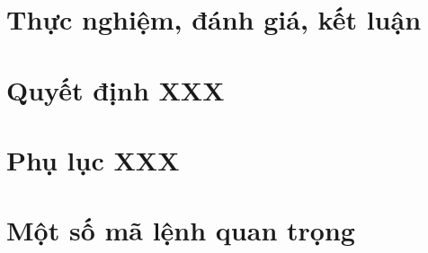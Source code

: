 \documentclass[a4paper,oneside,openright]{memoir}
\begin{document}
\chapter{Thực nghiệm, đánh giá, kết luận}




\nocite{*} %


\appendix

\chapter{Quyết định XXX}



\chapter{Phụ lục XXX}


\chapter{Một số mã lệnh quan trọng}

\end{document}

